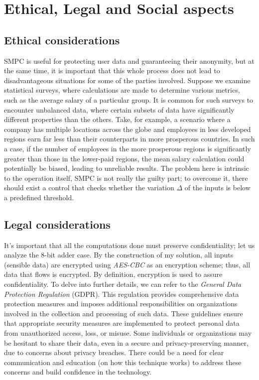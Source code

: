 \documentclass[12pt]{article}
\begin{document}
\section{Ethical, Legal and Social aspects}\label{sec:sel}
\subsection{Ethical considerations}
SMPC is useful for protecting user data and guaranteeing their anonymity, but at the same time, it is important that this whole process does not lead to disadvantageous situations for some of the parties involved. Suppose we examine statistical surveys, where calculations are made to determine various metrics, such as the average salary of a particular group. It is common for such surveys to encounter unbalanced data, where certain subsets of data have significantly different properties than the others. Take, for example, a scenario where a company has multiple locations across the globe and employees in less developed regions earn far less than their counterparts in more prosperous countries. In such a case, if the number of employees in the more prosperous regions is significantly greater than those in the lower-paid regions, the mean salary calculation could potentially be biased, leading to unreliable results. The problem here is intrinsic to the operation itself, SMPC is not really the guilty part; to overcome it, there should exist a control that checks whether the variation $\Delta$ of the inputs is below a predefined threshold.

\subsection{Legal considerations}
It's important that all the computations done must preserve confidentiality; let us analyze the 8-bit adder case. By the construction of my solution, all inputs (sensible data) are encrypted using \textit{AES-CBC} as an encryption scheme; thus, all data that flows is encrypted. By definition, encryption is used to assure confidentiality. To delve into further details, we can refer to the \textit{General Data Protection Regulation} (GDPR). This regulation provides comprehensive data protection measures and imposes additional responsibilities on organizations involved in the collection and processing of such data. These guidelines ensure that appropriate security measures are implemented to protect personal data from unauthorized access, loss, or misuse. Some individuals or organizations may be hesitant to share their data, even in a secure and privacy-preserving manner, due to concerns about privacy breaches. There could be a need for clear communication and education (on how this technique works) to address these concerns and build confidence in the technology.
\end{document}
